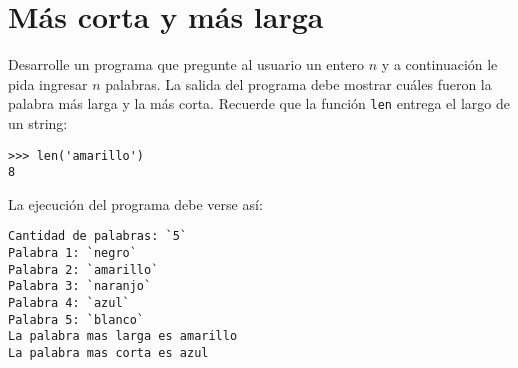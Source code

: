 \section{Más corta y más larga}

Desarrolle un programa que pregunte al usuario un entero \(n\)
y a conti\-nua\-ción le pida ingresar \(n\) palabras.
La salida del programa debe mostrar cuáles fueron la palabra más larga y la más corta.
Recuerde que la función \lstinline!len! entrega el largo de un string:
\begin{lstlisting}
>>> len('amarillo')
8
\end{lstlisting}
La ejecución del programa debe verse así:
\begin{lstlisting}[language=testcase]
Cantidad de palabras: `5`
Palabra 1: `negro`
Palabra 2: `amarillo`
Palabra 3: `naranjo`
Palabra 4: `azul`
Palabra 5: `blanco`
La palabra mas larga es amarillo
La palabra mas corta es azul
\end{lstlisting}


